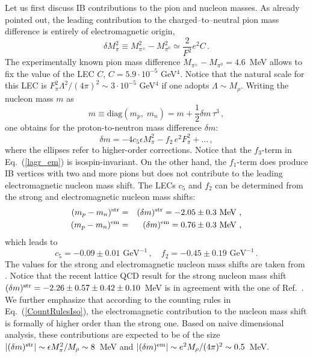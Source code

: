 \documentclass[aps,rmp,nofootinbib,twocolumn,floatfix]{revtex4}
\newcommand{\beq}{\begin{equation}}
\newcommand{\eeq}{\end{equation}}
\newcommand{\beqa}{\begin{eqnarray}}
\newcommand{\eeqa}{\end{eqnarray}}
\newcommand{\nn}{\nonumber \\ }
\begin{document}
Let us first discuss IB contributions to the pion and nucleon masses. As
already pointed out, the leading contribution to the charged--to--neutral pion
mass difference is entirely of electromagnetic origin, 
\beq
\delta  M_\pi^2 \equiv M_{\pi^\pm}^2 - M_{\pi^0}^2 \simeq  \frac{2}{F^2} e^2 C\,.
\eeq
The experimentally known pion mass difference $M_{\pi^\pm} - M_{\pi^0} = 4.6$~MeV allows  
to fix the value of the LEC $C$, $C = 5.9 \cdot 10^{-5}$ GeV$^4$. Notice that
the natural scale  
for this LEC is $F_\pi^2 \Lambda^2 /(4 \pi)^2 \sim 3 \cdot 10^{-5}$ GeV$^4$
if one adopts $\Lambda \sim M_\rho$. Writing the nucleon mass $m$ 
as 
\beq
m \equiv \mbox{diag} (m_p , \; m_n ) =  m + \frac{1}{2} \delta m \, \tau^3 \,,
\eeq
one obtains for the proton-to-neutron mass difference $\delta m$:
\beq
\label{m_nucl}
\delta m =  -4 c_5 \epsilon M_\pi^2   - f_2 \, e^2 F_\pi^2  + \ldots \,, 
\eeq
where the ellipses refer to higher-order corrections. 
Notice that the $f_3$-term in Eq.~(\ref{lagr_em}) is isospin-invariant. On the
other hand, the $f_1$-term does produce IB vertices with two and more pions
but  does not contribute to the leading electromagnetic
nucleon mass shift. 
The LECs $c_5$ and $f_2$ can be determined from the strong and electromagnetic
nucleon mass shifts:
\beqa
\label{m_shift2}
( m_p - m_n )^{\rm str} &=& (\delta m )^{\rm str} = -2.05 \pm 0.3 \mbox{
  MeV ,}  \nn 
( m_p - m_n  )^{\rm em} &=& (\delta  m )^{\rm em} = 0.76 \pm 0.3  \mbox{ MeV ,} 
\eeqa
which leads to \cite{Meissner:1997ii}
\beq
c_5 = -0.09 \pm 0.01  \mbox{ GeV}^{-1}\,, \quad  
f_2 = -0.45 \pm 0.19    \mbox{ GeV}^{-1}\,.
\nonumber
\eeq
The values for the strong and electromagnetic nucleon mass shifts 
are taken from \cite{Gasser:1982ap}. Notice that the recent lattice QCD 
result \cite{Beane:2006fk} for  the strong nucleon mass shift 
$(\delta m )^{\rm str} = - 2.26 \pm 0.57 \pm 0.42 \pm 0.10$~MeV is in
agreement with the one of Ref.~\cite{Gasser:1982ap}.  
We further emphasize that according to
the counting rules in Eq.~(\ref{CountRulesIso}), the electromagnetic
contribution to the nucleon mass shift is
formally of higher order than the strong one. Based on naive dimensional
analysis,  these contributions are expected to be of the size
$| (\delta m )^{\rm str}  | \sim \epsilon M_\pi^2 / M_\rho \sim 8$~MeV
and  $| (\delta  m )^{\rm em}  | \sim e^2 M_\rho /(4 \pi)^2 \sim 0.5$~MeV.  
\end{document}
